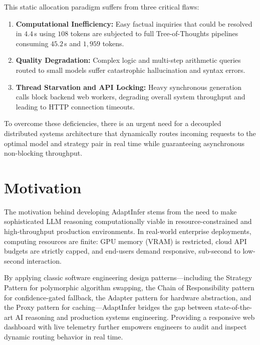\documentclass[12pt,a4paper]{report}
\begin{document}
This static allocation paradigm suffers from three critical flaws:
\begin{enumerate}[leftmargin=*]
    \item \textbf{Computational Inefficiency:} Easy factual inquiries that could be resolved in $4.4$\,s using $108$ tokens are subjected to full Tree-of-Thoughts pipelines consuming $45.2$\,s and $1,959$ tokens.
    \item \textbf{Quality Degradation:} Complex logic and multi-step arithmetic queries routed to small models suffer catastrophic hallucination and syntax errors.
    \item \textbf{Thread Starvation and API Locking:} Heavy synchronous generation calls block backend web workers, degrading overall system throughput and leading to HTTP connection timeouts.
\end{enumerate}

To overcome these deficiencies, there is an urgent need for a decoupled distributed systems architecture that dynamically routes incoming requests to the optimal model and strategy pair in real time while guaranteeing asynchronous non-blocking throughput.

\section{Motivation}
\label{sec:motivation}
The motivation behind developing AdaptInfer stems from the need to make sophisticated LLM reasoning computationally viable in resource-constrained and high-throughput production environments. In real-world enterprise deployments, computing resources are finite: GPU memory (VRAM) is restricted, cloud API budgets are strictly capped, and end-users demand responsive, sub-second to low-second interaction.

By applying classic software engineering design patterns—including the Strategy Pattern for polymorphic algorithm swapping, the Chain of Responsibility pattern for confidence-gated fallback, the Adapter pattern for hardware abstraction, and the Proxy pattern for caching—AdaptInfer bridges the gap between state-of-the-art AI reasoning and production systems engineering. Providing a responsive web dashboard with live telemetry further empowers engineers to audit and inspect dynamic routing behavior in real time.
\end{document}
